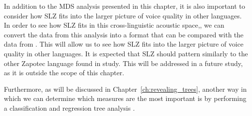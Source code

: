 In addition to the MDS analysis presented in this chapter, it is also important to consider how SLZ fits into the larger picture of voice quality in other languages. In order to see how SLZ fits in this cross-linguistic acoustic space,, we can convert the data from this analysis into a format that can be compared with the data from \citet{keatingCrosslanguageAcousticSpace2023}. This will allow us to see how SLZ fits into the larger picture of voice quality in other languages. It is expected that SLZ should pattern similarly to the other Zapotec language found in  study. This will be addressed in a future study, as it is outside the scope of this chapter.

Furthermore, as will be discussed in Chapter~\ref{ch:revealing_trees}, another way in which we can determine which measures are the most important is by performing a classification and regression tree analysis \citep{breimanClassificationRegressionTrees1986,breimanBaggingPredictors1996,breimanRandomForests2001}.